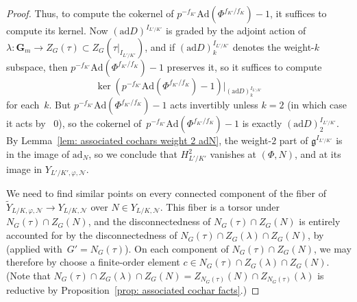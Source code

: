 \documentclass{amsart}
\renewcommand{\mathbb}{\mathbf}
\def\Ad{\mathrm{Ad}}
\def\ad{\mathrm{ad}}
\theoremstyle{definition}
\theoremstyle{remark}
\newcommand{\mar}[1]{}
\newcommand{\mar}[1]{\marginpar{\raggedright\tiny squirrel #1}}
\newcommand{\Q}{\QQ}
\newcommand{\GG}{{\mathbb G}}
\newcommand{\QQ}{{\mathbb Q}}
\newcommand{\Qp}{\Q_p}
\DeclareMathOperator{\GL}{GL}
\newcommand{\Gm}{\GG_m}
\begin{document}
\begin{proof}
  Thus, to compute the cokernel of
  $p^{-f_{K'}}\Ad(\Phi^{f_{K'}/f_K})-1$, it suffices to compute its
  kernel.  Now $(\ad D)^{I_{L'/K'}}$ is graded by the adjoint action
  of $\lambda:\Gm\rightarrow Z_G(\tau)\subset Z_G(\tau|_{I_{L'/K'}})$,
  and if $(\ad D)^{I_{L'/K'}}_k$ denotes the weight-$k$ subspace, then
  $p^{-f_{K'}}\Ad(\Phi^{f_{K'}/f_K})-1$ preserves it, so it suffices
  to compute
  \[\ker(p^{-f_{K'}}\Ad(\Phi^{f_{K'}/f_K})-1)|_{(\ad
    D)^{I_{L'/K'}}_k}\] for each~$k$.  But $p^{-f_{K'}}\Ad(\Phi^{f_{K'}/f_K})-1$
  acts invertibly unless $k=2$ (in which case it acts by~ $0$), so the
  cokernel of~$p^{-f_{K'}}\Ad(\Phi^{f_{K'}/f_K})-1$ is exactly $(\ad
    D)^{I_{L'/K'}}_2$.  By
  Lemma~\ref{lem: associated cochars weight 2 adN}, the weight-$2$ part
  of $\mathfrak{g}^{I_{L'/K'}}$ is in the image of $\ad_N$, so we
  conclude that $H^2_{L'/K'}$ vanishes at $(\Phi,N)$, and at its image in
  $Y_{L'/K',\varphi,\mathcal N}$.

  We need to find similar points on every connected component of the fiber of
  $\widetilde Y_{L/K,\varphi,\mathcal N}\rightarrow Y_{L/K,\mathcal N}$ over
  $N\in Y_{L/K,\mathcal N}$. %
  This
  fiber is a torsor under $N_G(\tau)\cap Z_G(N)$, and the
  disconnectedness of $N_G(\tau)\cap Z_G(N)$ is entirely accounted for
  by the disconnectedness of $N_G(\tau)\cap Z_G(\lambda)\cap Z_G(N)$,
  by~\cite[Prop.\ 4.9]{2014arXiv1403.1411B} (applied
  with~$G'=N_G(\tau)$). %
  On each component of $N_G(\tau)\cap Z_G(N)$,
  we may therefore by \cite[Lem.\ 5.3]{2014arXiv1403.1411B} choose a
  finite-order element %
  $c\in N_G(\tau)\cap Z_G(\lambda)\cap Z_G(N)$. (Note that
  $N_G(\tau)\cap Z_G(\lambda)\cap Z_G(N)=Z_{N_G(\tau)}(N)\cap
  Z_{N_G(\tau)}(\lambda)$ is reductive
  by Proposition~\ref{prop: associated
    cochar facts}.) %


\end{proof}
\end{document}
